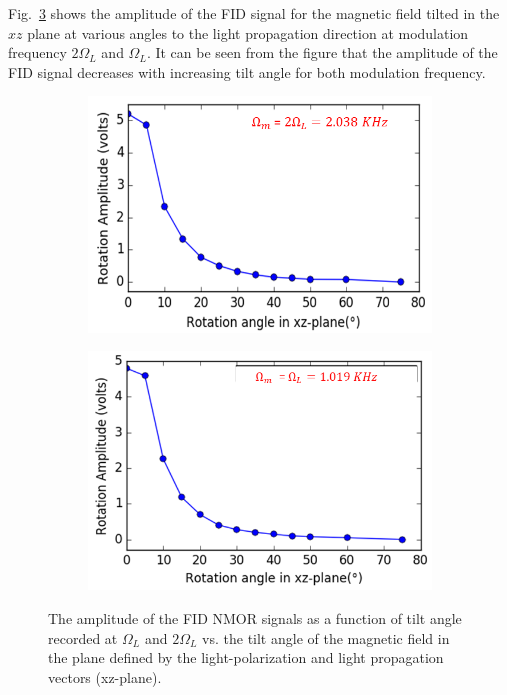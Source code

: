 Fig.~\ref{fig:tilted-wrong} shows the amplitude of the FID signal for the magnetic field tilted in the $xz$ plane at various angles to the light propagation direction at modulation frequency $2\Omega_L$ and $\Omega_L$. It can be seen from the figure that the amplitude of the FID signal decreases with increasing tilt angle for both modulation frequency.
\begin{figure}
    \centering
   \begin{subfigure}[b]{0.45\textwidth}
        \centering
        \includegraphics[width=\textwidth]{figures/tilt_x_larmor.png}
        \caption{}
        \label{fig:y equals x}
    \end{subfigure}
    \hfill
     \begin{subfigure}[b]{0.45\textwidth}
        \centering
        \includegraphics[width=\textwidth]{figures/tilt_x_2larmor.png}
        \caption{}
        \label{fig:three sin x}
    \end{subfigure}
    \caption{ The amplitude of the FID NMOR signals as a function
      of tilt angle recorded at $\Omega_L$ and $2\Omega_L$ vs. the
      tilt angle of the magnetic field in the plane defined by the
      light-polarization and light propagation vectors (xz-plane). \label{fig:tilted-wrong}}
\end{figure}


